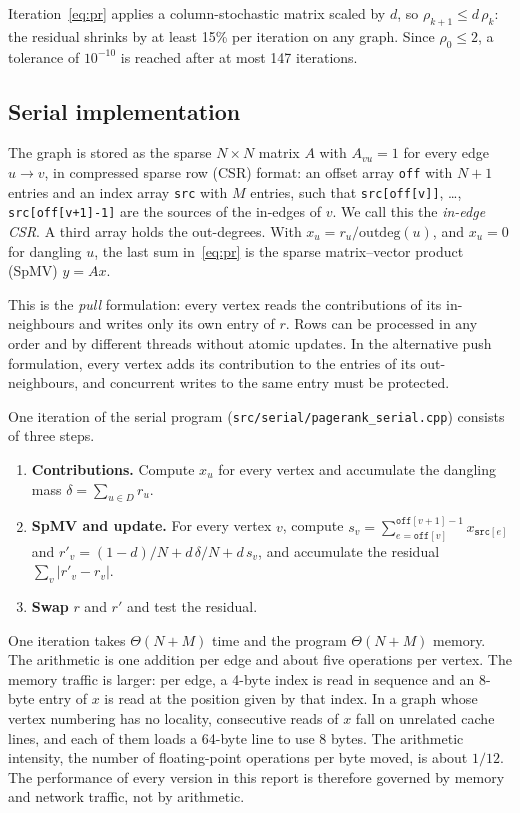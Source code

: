 \documentclass[11pt,a4paper]{article}
\newcommand{\code}[1]{\texttt{#1}}
\begin{document}
Iteration~\eqref{eq:pr} applies a column-stochastic matrix scaled by $d$, so $\rho_{k+1}\le d\,\rho_k$: the
residual shrinks by at least 15\% per iteration on any graph. Since $\rho_0\le 2$, a tolerance of $10^{-10}$ is reached
after at most 147 iterations.

\subsection{Serial implementation}

The graph is stored as the sparse $N\times N$ matrix $A$ with $A_{vu}=1$ for every edge $u\to v$, in compressed
sparse row (CSR) format: an offset array \code{off} with $N+1$ entries and an index array \code{src} with $M$
entries, such that \code{src[off[v]]}, \ldots, \code{src[off[v+1]-1]} are the sources of the in-edges of $v$. We call
this the \emph{in-edge CSR}. A third array holds the out-degrees. With $x_u=r_u/\mathrm{outdeg}(u)$, and $x_u=0$ for
dangling $u$, the last sum in~\eqref{eq:pr} is the sparse matrix--vector product (SpMV) $y=Ax$.

This is the \emph{pull} formulation: every vertex reads the contributions of its in-neighbours and writes only its
own entry of $r$. Rows can be processed in any order and by different threads without atomic updates. In the
alternative push formulation, every vertex adds its contribution to the entries of its out-neighbours, and concurrent
writes to the same entry must be protected.

One iteration of the serial program (\code{src/serial/pagerank\_serial.cpp}) consists of three steps.
\begin{enumerate}
\item \textbf{Contributions.} Compute $x_u$ for every vertex and accumulate the dangling mass
  $\delta=\sum_{u\in D} r_u$.
\item \textbf{SpMV and update.} For every vertex $v$, compute
  $s_v=\sum_{e=\mathtt{off}[v]}^{\mathtt{off}[v+1]-1} x_{\mathtt{src}[e]}$ and
  $r'_v=(1-d)/N + d\,\delta/N + d\,s_v$, and accumulate the residual $\sum_v |r'_v-r_v|$.
\item \textbf{Swap} $r$ and $r'$ and test the residual.
\end{enumerate}
One iteration takes $\Theta(N+M)$ time and the program $\Theta(N+M)$ memory. The arithmetic is one addition per edge
and about five operations per vertex. The memory traffic is larger: per edge, a 4-byte index is read in sequence and
an 8-byte entry of $x$ is read at the position given by that index. In a graph whose vertex numbering has no
locality, consecutive reads of $x$ fall on unrelated cache lines, and each of them loads a 64-byte line to use 8
bytes. The arithmetic intensity, the number of floating-point operations per byte moved, is about $1/12$. The
performance of every version in this report is therefore governed by memory and network traffic, not by arithmetic.
\end{document}
